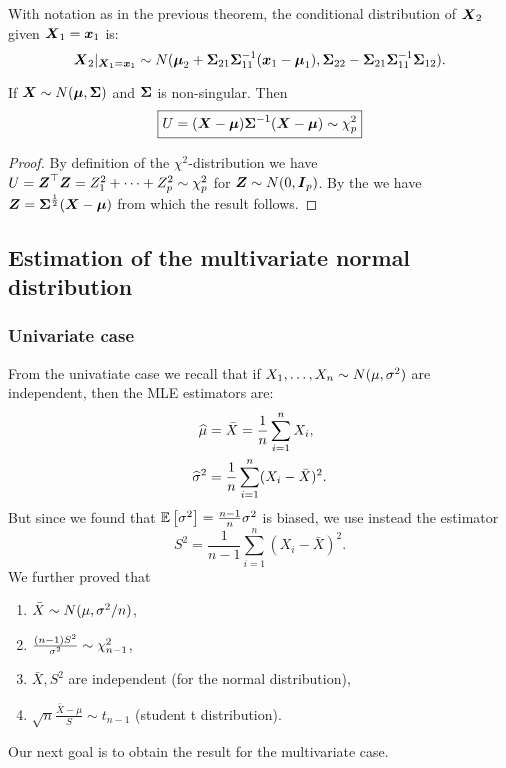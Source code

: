 \begin{theorem}
    With notation as in the previous theorem, the conditional distribution of $\boldsymbol{X}_2$ given $\boldsymbol{X}_1=\boldsymbol{x}_1$ is:
    $$
        \boldsymbol{X}_2 |_{\boldsymbol{X}_1 = \boldsymbol{x}_1} \sim N(\boldsymbol{\mu}_2 + \boldsymbol{\Sigma}_{21}\boldsymbol{\Sigma}_{11}^{-1}(\boldsymbol{x}_1-\boldsymbol{\mu}_1), \boldsymbol{\Sigma}_{22}-\boldsymbol{\Sigma}_{21}\boldsymbol{\Sigma}_{11}^{-1}\boldsymbol{\Sigma}_{12}).
    $$
\end{theorem}

\begin{theorem}
    If $\boldsymbol{X}\sim N(\boldsymbol{\mu}, \boldsymbol{\Sigma})$ and $\boldsymbol{\Sigma}$ is non-singular. Then 
    $$
        \boxed{U = (\boldsymbol{X}-\boldsymbol{\mu})\boldsymbol{\Sigma}^{-1}(\boldsymbol{X}-\boldsymbol{\mu}) \sim \chi^2_p}
    $$
\end{theorem}
\begin{proof}
    By definition of the $\chi^2$-distribution we have $U=\boldsymbol{Z}^\top\boldsymbol{Z}=Z_1^2+\dots+Z_p^2 \sim \chi_p^2$ for $\boldsymbol{Z}\sim N(0, \boldsymbol{I}_p)$. By the  we have $\boldsymbol{Z}=\boldsymbol{\Sigma}^{\frac{1}{2}}(\boldsymbol{X}-\boldsymbol{\mu})$ from which the result follows. 
\end{proof}


\subsection{Estimation of the multivariate normal distribution}
\subsubsection{Univariate case}
From the univatiate case we recall that if $X_1,\dots,X_n \sim N(\mu, {\sigma^2})$ are independent, then the MLE estimators are:
\begin{align*}
    \widehat{\mu} &= \bar{X} = \frac{1}{n} \sum_{i=1}^n X_i, \\
    \widehat{\sigma}^2 &= \frac{1}{n} \sum_{i=1}^n (X_i-\bar{X})^2.
\end{align*}
But since we found that $\mathbb{E}\left[\sigma^2\right]=\frac{n-1}{n} \sigma^2$ is biased, we use instead the estimator
$$
    S^2 = \frac{1}{n-1} \sum_{i=1}^n (X_i-\bar{X})^2.
$$
We further proved that
\begin{enumerate}
    \item $\bar{X} \sim N(\mu, \sigma^2/n)$,
    \item $\frac{(n-1)S^2}{\sigma^2} \sim \chi^2_{n-1}$,
    \item $\bar{X}, S^2$ are independent (for the normal distribution),
    \item $\sqrt{n} \frac{\bar{X}-\mu}{S} \sim t_{n-1}$ (student t distribution).
\end{enumerate}
Our next goal is to obtain the result for the multivariate case. 

